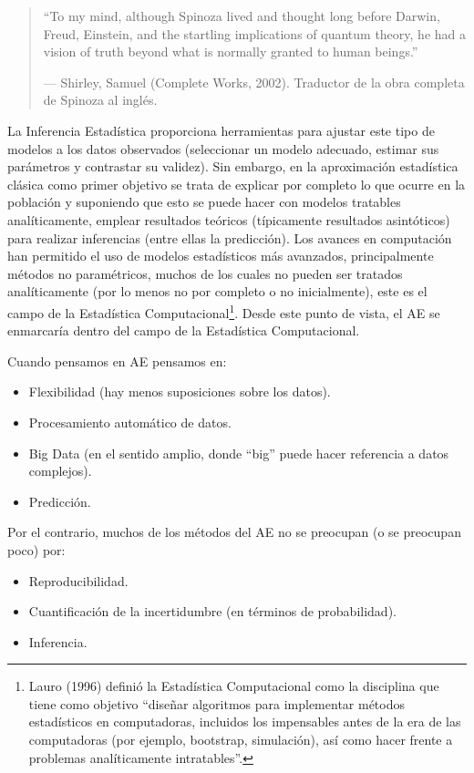 \documentclass[]{book}
\theoremstyle{break}
\theoremstyle{definition}
\theoremstyle{definition}
\theoremstyle{definition}
\theoremstyle{remark}
\begin{document}
\begin{quote}
``To my mind, although Spinoza lived and thought long before Darwin,
Freud, Einstein, and the startling implications of quantum theory, he
had a vision of truth beyond what is normally granted to human beings.''

--- Shirley, Samuel (Complete Works, 2002). Traductor de la obra
completa de Spinoza al inglés.
\end{quote}

La Inferencia Estadística proporciona herramientas para ajustar este
tipo de modelos a los datos observados (seleccionar un modelo adecuado,
estimar sus parámetros y contrastar su validez). Sin embargo, en la
aproximación estadística clásica como primer objetivo se trata de
explicar por completo lo que ocurre en la población y suponiendo que
esto se puede hacer con modelos tratables analíticamente, emplear
resultados teóricos (típicamente resultados asintóticos) para realizar
inferencias (entre ellas la predicción). Los avances en computación han
permitido el uso de modelos estadísticos más avanzados, principalmente
métodos no paramétricos, muchos de los cuales no pueden ser tratados
analíticamente (por lo menos no por completo o no inicialmente), este es
el campo de la Estadística Computacional\footnote{Lauro (1996) definió
  la Estadística Computacional como la disciplina que tiene como
  objetivo ``diseñar algoritmos para implementar métodos estadísticos en
  computadoras, incluidos los impensables antes de la era de las
  computadoras (por ejemplo, bootstrap, simulación), así como hacer
  frente a problemas analíticamente intratables''.}. Desde este punto de
vista, el AE se enmarcaría dentro del campo de la Estadística
Computacional.

Cuando pensamos en AE pensamos en:

\begin{itemize}
\item
  Flexibilidad (hay menos suposiciones sobre los datos).
\item
  Procesamiento automático de datos.
\item
  Big Data (en el sentido amplio, donde ``big'' puede hacer referencia a
  datos complejos).
\item
  Predicción.
\end{itemize}

Por el contrario, muchos de los métodos del AE no se preocupan (o se
preocupan poco) por:

\begin{itemize}
\item
  Reproducibilidad.
\item
  Cuantificación de la incertidumbre (en términos de probabilidad).
\item
  Inferencia.
\end{itemize}
\end{document}
